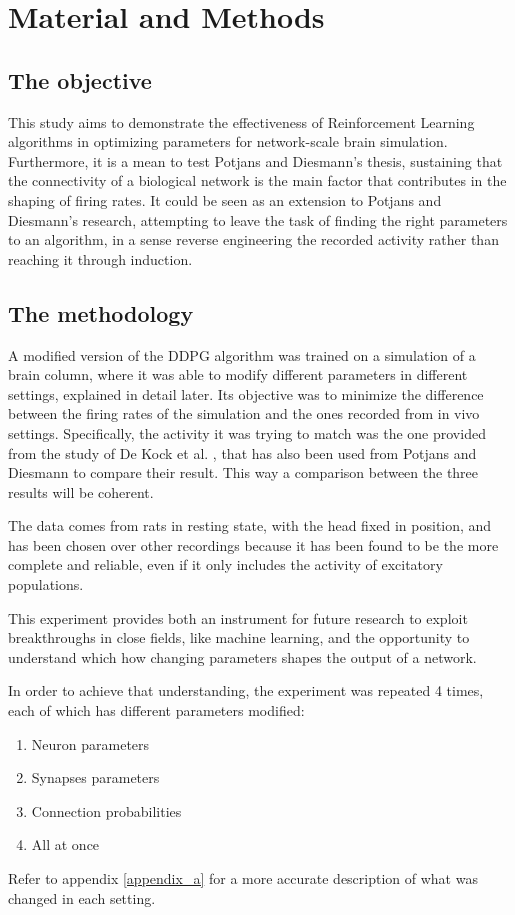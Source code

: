 \section{Material and Methods}

\subsection{The objective} 

This study aims to demonstrate the effectiveness of Reinforcement Learning algorithms in optimizing parameters for network-scale brain simulation. Furthermore, it is a mean to test Potjans and Diesmann's thesis, sustaining that the connectivity of a biological network is the main factor that contributes in the shaping of firing rates.
It could be seen as an extension to Potjans and Diesmann's research, attempting to leave the task of finding the right parameters to an algorithm, in a sense reverse engineering the recorded activity rather than reaching it through induction. 


\subsection{The methodology} 

A modified version of the DDPG algorithm was trained on a simulation of a brain column, where it was able to modify different parameters in different settings, explained in detail later. Its objective was to minimize the difference between the firing rates of the simulation and the ones recorded from in vivo settings. Specifically, the activity it was trying to match was the one provided from the study of De Kock et al. \cite{kock}, that has also been used from Potjans and Diesmann to compare their result. This way a comparison between the three results will be coherent.

The data \cite{kock} comes from rats in resting state, with the head fixed in position, and has been chosen over other recordings because it has been found to be the more complete and reliable, even if it only includes the activity of excitatory populations. 


This experiment provides both an instrument for future research to exploit breakthroughs in close fields, like machine learning, and the opportunity to understand which how changing parameters shapes the output of a network.

In order to achieve that understanding, the experiment was repeated 4 times, each of which has different parameters modified:
\begin{enumerate}[noitemsep]
	\item Neuron parameters
	\item Synapses parameters
	\item Connection probabilities 
	\item All at once
\end{enumerate}
Refer to appendix \ref{appendix_a} for a more accurate description of what was changed in each setting.


